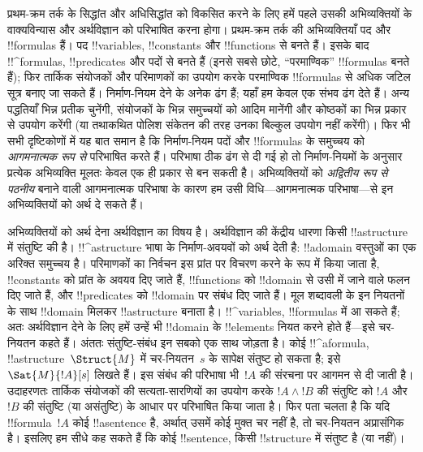 \documentclass[../../../include/open-logic-section]{subfiles}
\begin{document}


प्रथम-क्रम तर्क के सिद्धांत और अधिसिद्धांत को विकसित करने के लिए हमें पहले
उसकी अभिव्यक्तियों के वाक्यविन्यास और अर्थविज्ञान को परिभाषित करना होगा।
प्रथम-क्रम तर्क की अभिव्यक्तियाँ पद और !!{formula}s हैं। पद !!{variable}s,
!!{constant}s और !!{function}s से बनते हैं। इसके बाद !!^{formula}s,
!!{predicate}s और पदों से बनते हैं (इनसे सबसे छोटे, ``परमाण्विक''
!!{formula}s बनते हैं); फिर तार्किक संयोजकों और परिमाणकों का उपयोग करके
परमाण्विक !!{formula}s से अधिक जटिल सूत्र बनाए जा सकते हैं। निर्माण-नियम
देने के अनेक ढंग हैं; यहाँ हम केवल एक संभव ढंग देते हैं। अन्य पद्धतियाँ भिन्न
प्रतीक चुनेंगी, संयोजकों के भिन्न समुच्चयों को आदिम मानेंगी और कोष्ठकों का
भिन्न प्रकार से उपयोग करेंगी (या तथाकथित पोलिश संकेतन की तरह उनका बिल्कुल
उपयोग नहीं करेंगी)। फिर भी सभी दृष्टिकोणों में यह बात समान है कि निर्माण-नियम
पदों और !!{formula}s के समुच्चय को \emph{आगमनात्मक रूप से} परिभाषित करते हैं।
परिभाषा ठीक ढंग से दी गई हो तो निर्माण-नियमों के अनुसार प्रत्येक अभिव्यक्ति
मूलतः केवल एक ही प्रकार से बन सकती है। अभिव्यक्तियों को \emph{अद्वितीय रूप से
पठनीय} बनाने वाली आगमनात्मक परिभाषा के कारण हम उसी विधि---आगमनात्मक
परिभाषा---से इन अभिव्यक्तियों को अर्थ दे सकते हैं।

अभिव्यक्तियों को अर्थ देना अर्थविज्ञान का विषय है। अर्थविज्ञान की केंद्रीय
धारणा किसी !!a{structure} में संतुष्टि की है। !!^a{structure} भाषा के
निर्माण-अवयवों को अर्थ देती है: !!a{domain} वस्तुओं का एक अरिक्त समुच्चय
है। परिमाणकों का निर्वचन इस प्रांत पर विचरण करने के रूप में किया जाता है,
!!{constant}s को प्रांत के अवयव दिए जाते हैं, !!{function}s को !!{domain}
से उसी में जाने वाले फलन दिए जाते हैं, और !!{predicate}s को !!{domain} पर
संबंध दिए जाते हैं। मूल शब्दावली के इन नियतनों के साथ !!{domain} मिलकर
!!a{structure} बनाता है। !!^{variable}s, !!{formula}s में आ सकते हैं; अतः
अर्थविज्ञान देने के लिए हमें उन्हें भी !!{domain} के !!{element}s नियत करने
होते हैं---इसे चर-नियतन कहते हैं। अंततः संतुष्टि-संबंध इन सबको एक साथ जोड़ता
है। कोई !!^a{formula}, !!a{structure}~$\Struct{M}$ में चर-नियतन~$s$ के
सापेक्ष संतुष्ट हो सकता है; इसे $\Sat{M}{!A}[s]$ लिखते हैं। इस संबंध की
परिभाषा भी~$!A$ की संरचना पर आगमन से दी जाती है। उदाहरणतः तार्किक संयोजकों
की सत्यता-सारणियों का उपयोग करके $!A \land !B$ की संतुष्टि को $!A$ और~$!B$
की संतुष्टि (या असंतुष्टि) के आधार पर परिभाषित किया जाता है। फिर पता चलता है
कि यदि !!{formula}~$!A$ कोई !!a{sentence} है, अर्थात् उसमें कोई मुक्त चर
नहीं है, तो चर-नियतन अप्रासंगिक है। इसलिए हम सीधे कह सकते हैं कि कोई
!!{sentence}, किसी !!{structure} में संतुष्ट है (या नहीं)।
\end{document}

